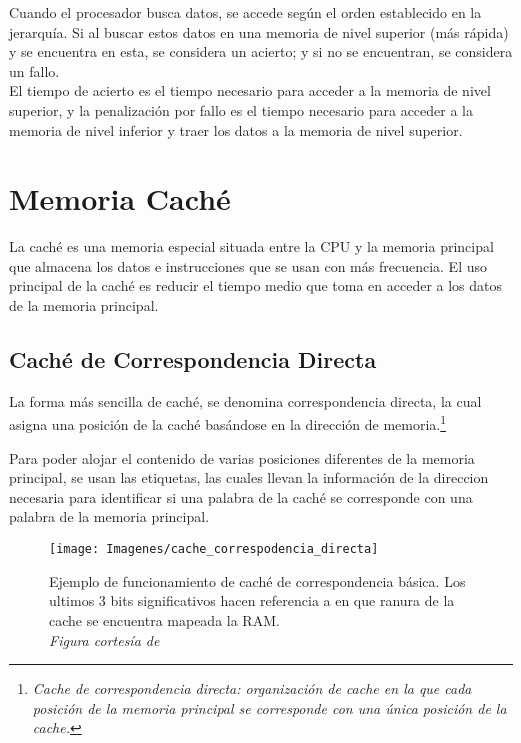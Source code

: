 \documentclass[12pt]{article}
\begin{document}
	Cuando el procesador busca datos, se accede según el orden establecido en la jerarquía. Si al buscar estos datos en una memoria de nivel superior (más rápida) y se encuentra en esta, se considera un acierto; y si no se encuentran, se considera un fallo.\\

	El tiempo de acierto es el tiempo necesario para acceder a la memoria de nivel superior, y la penalización por fallo es el tiempo necesario para acceder a la memoria de nivel inferior y traer los datos a la memoria de nivel superior.

\section{Memoria Caché} \cite{patterson-2011}
	La caché es una memoria especial situada entre la CPU y la memoria principal que almacena los datos e instrucciones que se usan con más frecuencia. El uso principal de la caché es reducir el tiempo medio que toma en acceder a los datos de la memoria principal. \cite{geeksforgeeks-2023} \\

	\subsection{Caché de Correspondencia Directa}
		La forma más sencilla de caché, se denomina correspondencia directa, la cual asigna una posición de la caché basándose en la dirección de memoria.\footnote{\textit{Cache de correspondencia directa: organización de cache en la que cada posición de la memoria principal se corresponde con una única posición de la cache.}}

		Para poder alojar el contenido de varias posiciones diferentes de la memoria principal, se usan las etiquetas, las cuales llevan la información de la direccion necesaria para identificar si una palabra de la caché se corresponde con una palabra de la memoria principal.

		\begin{figure}[H]
			\centering
			\texttt{[image: Imagenes/cache\_correspodencia\_directa]}
			\caption{Ejemplo de funcionamiento de caché de correspondencia básica. Los ultimos 3 bits significativos hacen referencia a en que ranura de la cache se encuentra mapeada la RAM.\\
			\textit{Figura cortesía de \cite{patterson-2011}}}
			\label{fig:cachecorrespodenciadirecta}
		\end{figure}
\end{document}
